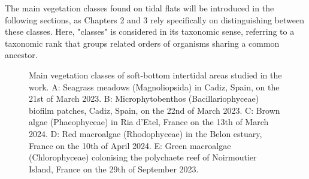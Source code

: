 \documentclass[
  letterpaper,
  11pt,
  english,
  singlespacing,
  headsepline]{MastersDoctoralThesis}
\begin{document}
\begin{spacing}{1.5}
\begin{tcolorbox}
The main vegetation classes found on tidal flats will be introduced in the following sections, as Chapters 2 and 3 rely specifically on distinguishing between these classes. Here, "classes" is considered in its taxonomic sense, referring to a taxonomic rank that groups related orders of organisms sharing a common ancestor.
\end{tcolorbox}

\begin{figure}


\caption{\label{fig-Vegetations_intro}Main vegetation classes of
soft-bottom intertidal areas studied in the work. A: Seagrass meadows
(Magnoliopsida) in Cadiz, Spain, on the 21st of March 2023. B:
Microphytobenthos (Bacillariophyceae) biofilm patches, Cadiz, Spain, on
the 22nd of March 2023. C: Brown algae (Phaeophyceae) in Ria d'Etel,
France on the 13th of March 2024. D: Red macroalgae (Rhodophyceae) in
the Belon estuary, France on the 10th of April 2024. E: Green macroalgae
(Chlorophyceae) colonising the polychaete reef of Noirmoutier Island,
France on the 29th of September 2023.}


\end{figure}
\end{spacing}
\end{document}
